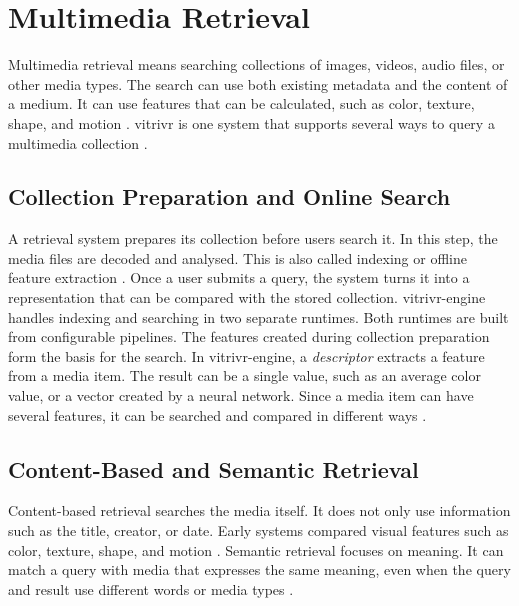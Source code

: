 \section{Multimedia Retrieval}
\label{sec:background-multimedia-retrieval}

Multimedia retrieval means searching collections of images, videos, audio files, or other media types. The search can use both existing metadata and the content of a medium. It can use features that can be calculated, such as color, texture, shape, and motion \citep{flickner1995qbic}. vitrivr is one system that supports several ways to query a multimedia collection \citep{rossetto2016vitrivr}.

\subsection{Collection Preparation and Online Search}
\label{subsec:background-index-query}

A retrieval system prepares its collection before users search it. In this step, the media files are decoded and analysed. This is also called indexing or offline feature extraction \citep{flickner1995qbic,gasser2024engine}. Once a user submits a query, the system turns it into a representation that can be compared with the stored collection. vitrivr-engine handles indexing and searching in two separate runtimes. Both runtimes are built from configurable pipelines. The features created during collection preparation form the basis for the search. In vitrivr-engine, a \emph{descriptor} extracts a feature from a media item. The result can be a single value, such as an average color value, or a vector created by a neural network. Since a media item can have several features, it can be searched and compared in different ways \citep{gasser2020cottontail,gasser2024engine}.

\subsection{Content-Based and Semantic Retrieval}
\label{subsec:background-content-semantic}

Content-based retrieval searches the media itself. It does not only use information such as the title, creator, or date. Early systems compared visual features such as color, texture, shape, and motion \citep{flickner1995qbic}. Semantic retrieval focuses on meaning. It can match a query with media that expresses the same meaning, even when the query and result use different words or media types \citep{radford2021clip}.


